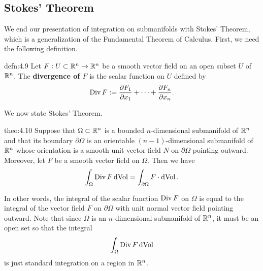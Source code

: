 \subsection{Stokes' Theorem} \label{subsec:4.3}
We end our presentation of integration on submanifolds with Stokes' Theorem, 
which is a generalization of the Fundamental Theorem of Calculus. 
First, we need the following definition. 

\begin{defn}{defn:4.9}
    Let $F : U \subset \mathbb{R}^n \to \mathbb{R}^n$ be a smooth vector field on an 
    open subset $U$ of $\mathbb{R}^n$. The {\bf divergence of $F$} is the 
    scalar function on $U$ defined by 
    \[ \operatorname{Div} F := \frac{\partial F_1}{\partial x_1} + \cdots + \frac{\partial F_n}{\partial x_n}. \] 
\end{defn}\vspace{-0.25cm}

We now state Stokes' Theorem. 

\begin{theo}{theo:4.10}
    Suppose that $\Omega \subset \mathbb{R}^n$ is a bounded $n$-dimensional submanifold 
    of $\mathbb{R}^n$ and that its boundary $\partial\Omega$ is an orientable 
    $(n-1)$-dimensional submanifold of $\mathbb{R}^n$ whose orientation is a 
    smooth unit vector field $N$ on $\partial\Omega$ pointing outward. 
    Moreover, let $F$ be a smooth vector field on $\Omega$. Then we have 
    \[ \int_\Omega \operatorname{Div} F \operatorname{dVol} = \int_{\partial\Omega} F\cdot\operatorname{dVol}. \] 
\end{theo}\vspace{-0.25cm}

In other words, the integral of the scalar function $\operatorname{Div} F$ on $\Omega$ 
is equal to the integral of the vector field $F$ on $\partial\Omega$ 
with unit normal vector field pointing outward. Note that since $\Omega$ 
is an $n$-dimensional submanifold of $\mathbb{R}^n$, it must be an open set 
so that the integral 
\[ \int_\Omega \operatorname{Div} F \operatorname{dVol} \] 
is just standard integration on a region in $\mathbb{R}^n$. 

